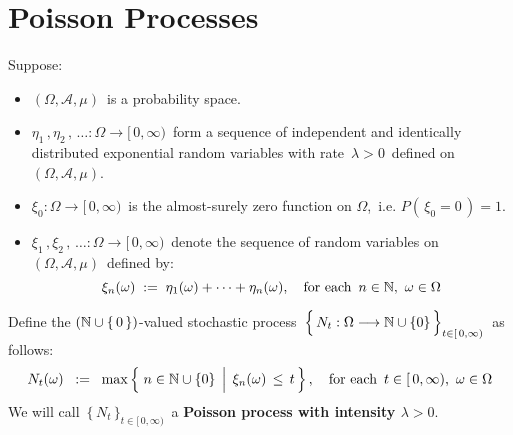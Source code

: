 

\section{Poisson Processes}
\setcounter{theorem}{0}
\setcounter{equation}{0}


\renewcommand{\theenumi}{\roman{enumi}}
\renewcommand{\labelenumi}{\textnormal{(\theenumi)}$\;\;$}


Suppose:
\begin{itemize}
\item
	$(\Omega,\mathcal{A},\mu)$\, is a probability space.
\item
	$\eta_{1}\,, \eta_{2}\,, \,\ldots : \Omega \longrightarrow [\,0,\infty)$\,
	form a sequence of independent and identically distributed
	exponential random variables with rate \,$\lambda > 0$\,
	defined on \,$(\Omega,\mathcal{A},\mu)$.
\item
	$\xi_{0} : \Omega \longrightarrow [\,0,\infty)$\, is the almost-surely zero function on $\Omega$,\,
	i.e. $P(\,\xi_{0} = 0\,) = 1$.
\item
	$\xi_{1}\,, \xi_{2}\,, \,\ldots : \Omega \longrightarrow [\,0,\infty)$\,
	denote the sequence of random variables on
	\,$(\Omega,\mathcal{A},\mu)$\, defined by:
	\begin{equation*}
	\xi_{n}(\omega) \; := \; \eta_{1}(\omega) + \cdots + \eta_{n}(\omega),
	\quad
	\textnormal{for each \,$n \in \mathbb{N}$,\, $\omega \in \Omega$}
	\end{equation*}
\end{itemize}
Define the $(\mathbb{N}\cup\{\,0\,\})$-valued stochastic process
\,$\left\{\,N_{t} : \Omega \overset{{\color{white}-}}{\longrightarrow} \N\cup\{0\}\,\right\}_{t\in[\,0,\infty)}$\,
as follows:
\begin{equation*}
N_{t}(\omega)
\;\; := \;\;
	\max\left\{\,\left.
		n \overset{{\color{white}.}}{\in} \N\cup\{0\}
		\,\;\right\vert\;
		\xi_{n}(\omega) \,\leq\, t
		\,\right\},
\quad
\textnormal{for each \,$t \in [\,0,\infty)$,\, $\omega \in \Omega$}
\end{equation*}
We will call \,$\{\,N_{t}\,\}_{t\in[\,0,\infty)}$\, a \textbf{Poisson process with intensity $\lambda > 0$}.


